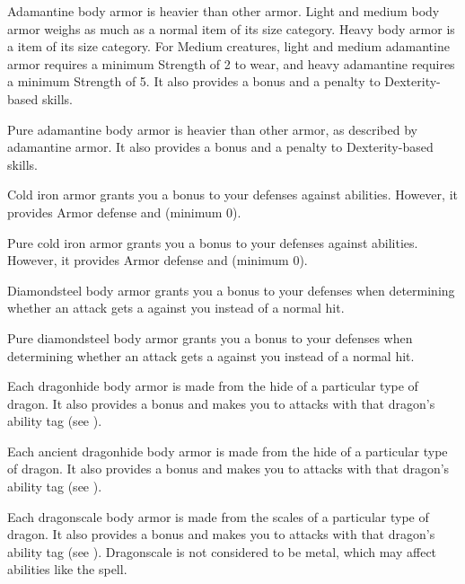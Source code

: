        Adamantine body armor is heavier than other armor.
      Light and medium body armor weighs as much as a normal item of its size category.
      Heavy body armor is a  item of its size category.
      For Medium creatures, light and medium adamantine armor requires a minimum Strength of 2 to wear, and heavy adamantine requires a minimum Strength of 5.
      It also provides a   bonus and a  penalty to Dexterity-based skills.

       Pure adamantine body armor is heavier than other armor, as described by adamantine armor.
      It also provides a   bonus and a  penalty to Dexterity-based skills.

       Cold iron armor grants you a  bonus to your defenses against \magical abilities.
      However, it provides  Armor defense and   (minimum 0).

       Pure cold iron armor grants you a  bonus to your defenses against \magical abilities.
      However, it provides  Armor defense and   (minimum 0).

       Diamondsteel body armor grants you a  bonus to your defenses when determining whether an attack gets a  against you instead of a normal hit.

       Pure diamondsteel body armor grants you a  bonus to your defenses when determining whether an attack gets a  against you instead of a normal hit.

       Each dragonhide body armor is made from the hide of a particular type of dragon.
      It also provides a   bonus and makes you \resistant to attacks with that dragon's ability tag (see ).

       Each ancient dragonhide body armor is made from the hide of a particular type of dragon.
      It also provides a   bonus and makes you  to attacks with that dragon's ability tag (see ).

       Each dragonscale body armor is made from the scales of a particular type of dragon.
      It also provides a   bonus and makes you \resistant to attacks with that dragon's ability tag (see ).
      Dragonscale is not considered to be metal, which may affect abilities like the  spell.

